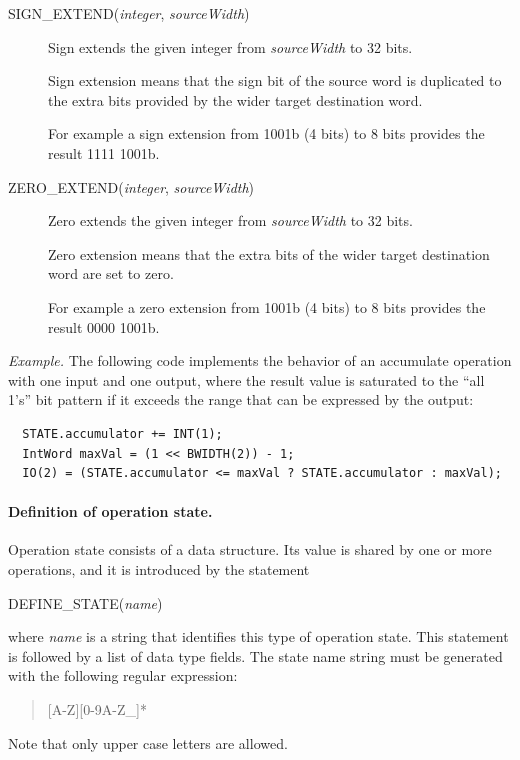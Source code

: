 \documentclass[twoside]{tceusermanual}
\begin{document}
\begin{description}
\item[SIGN\_EXTEND(\emph{integer}, \emph{sourceWidth})]%
  Sign extends the given integer from \emph{sourceWidth} to 32 bits.
 
  Sign extension means that the sign bit of the source word is duplicated
  to the extra bits provided by the wider target destination word.

  For example a sign extension from 1001b (4 bits) to 8 bits provides
  the result 1111 1001b.

\item[ZERO\_EXTEND(\emph{integer}, \emph{sourceWidth})]%
  Zero extends the given integer from \emph{sourceWidth} to 32 bits.

  Zero extension means that the extra bits of the wider target destination
  word are set to zero. 

  For example a zero extension from 1001b (4 bits) to 8 bits provides
  the result 0000 1001b.

\end{description}

\emph{Example.} The following code implements the behavior of an accumulate
operation with one input and one output, where the result value is saturated
to the ``all 1's'' bit pattern if it exceeds the range that can be expressed
by the output:
\begin{verbatim}
  STATE.accumulator += INT(1);
  IntWord maxVal = (1 << BWIDTH(2)) - 1;
  IO(2) = (STATE.accumulator <= maxVal ? STATE.accumulator : maxVal);
\end{verbatim}

\paragraph{Definition of operation state.}
Operation state consists of a data structure.  Its value
is shared by one or more operations, and it is introduced by the statement
\begin{description}
\item[DEFINE\_STATE(\emph{name})]
\end{description}
where \emph{name} is a string that identifies this type of operation state.
This statement is followed by a list of data type fields. The state name
string must be generated with the following regular expression:
\begin{quote}
  [A-Z][0-9A-Z\_]*
\end{quote}
Note that only upper case letters are allowed.
\end{document}
